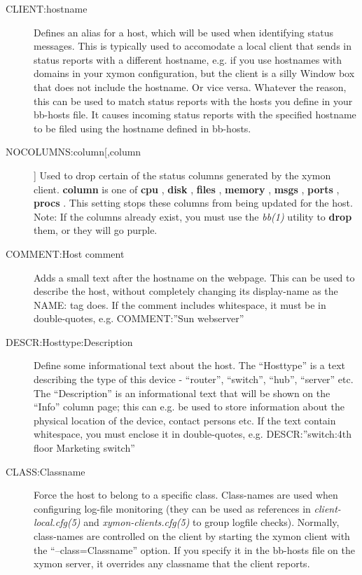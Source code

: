 \begin{description}
 

\item[CLIENT:hostname] Defines an alias for a host, which will be used
  when identifying status messages. This is typically used to
  accomodate a local client that sends in status reports with a
  different hostname, e.g. if you use hostnames with domains in your
  xymon configuration, but the client is a silly Window box that does
  not include the hostname. Or vice versa. Whatever the reason, this
  can be used to match status reports with the hosts you define in
  your bb-hosts file. It causes incoming status reports with the
  specified hostname to be filed using the hostname defined in
  bb-hosts. 


 

\item[NOCOLUMNS:column[,column]] Used to drop certain of the status columns generated by the xymon client. \textbf{column}
 is one of \textbf{cpu}
, \textbf{disk}
, \textbf{files}
, \textbf{memory}
, \textbf{msgs}
, \textbf{ports}
, \textbf{procs}
. This setting stops these columns from being updated for the host. Note: If the columns already exist, you must use the \emph{bb(1)}
 utility to \textbf{drop}
 them, or they will go purple. 

 

\item[COMMENT:Host comment] Adds a small text after the hostname on
  the webpage. This can be used to describe the host, without
  completely changing its display-name as the NAME: tag does. If the
  comment includes whitespace, it must be in double-quotes,
  e.g. COMMENT:''Sun webserver'' 


 

\item[DESCR:Hosttype:Description] Define some informational text about
  the host. The ``Hosttype'' is a text describing the type of this
  device - ``router'', ``switch'', ``hub'', ``server'' etc. The
  ``Description'' is an informational text that will be shown on the
  ``Info'' column page; this can e.g. be used to store information
  about the physical location of the device, contact persons etc. If
  the text contain whitespace, you must enclose it in double-quotes,
  e.g. DESCR:''switch:4th floor Marketing switch'' 


 

\item[CLASS:Classname] Force the host to belong to a specific
  class. Class-names are used when configuring log-file monitoring
  (they can be used as references in \emph{client-local.cfg(5)} and
  \emph{xymon-clients.cfg(5)} to group logfile checks). Normally,
  class-names are controlled on the client by starting the xymon
  client with the ``--class=Classname'' option. If you specify it in
  the bb-hosts file on the xymon server, it overrides any classname
  that the client reports. 



\end{description}
